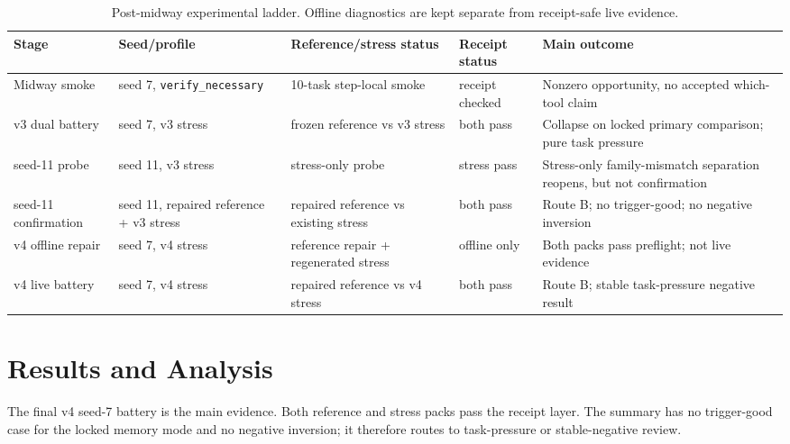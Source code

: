 \documentclass[11pt]{article}
\begin{document}
\begin{table}[t]
\scriptsize
\centering
\setlength{\tabcolsep}{3pt}
\begin{tabular}{@{}p{}p{}p{}p{}p{}@{}}
\toprule
Stage & Seed/profile & Reference/stress status & Receipt status & Main outcome \\
\midrule
Midway smoke & seed 7, \texttt{verify\_necessary} & 10-task step-local smoke & receipt checked & Nonzero opportunity, no accepted which-tool claim \\
v3 dual battery & seed 7, v3 stress & frozen reference vs v3 stress & both pass & Collapse on locked primary comparison; pure task pressure \\
seed-11 probe & seed 11, v3 stress & stress-only probe & stress pass & Stress-only family-mismatch separation reopens, but not confirmation \\
seed-11 confirmation & seed 11, repaired reference + v3 stress & repaired reference vs existing stress & both pass & Route B; no trigger-good; no negative inversion \\
v4 offline repair & seed 7, v4 stress & reference repair + regenerated stress & offline only & Both packs pass preflight; not live evidence \\
v4 live battery & seed 7, v4 stress & repaired reference vs v4 stress & both pass & Route B; stable task-pressure negative result \\
\bottomrule
\end{tabular}
\caption{Post-midway experimental ladder. Offline diagnostics are kept separate from receipt-safe live evidence.}
\label{tab:ladder}
\end{table}

\section{Results and Analysis}

The final v4 seed-7 battery is the main evidence. Both reference and stress packs pass the receipt layer. The summary has no trigger-good case for the locked memory mode and no negative inversion; it therefore routes to task-pressure or stable-negative review.
\end{document}
